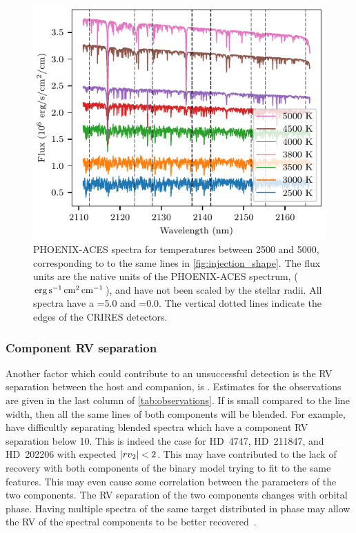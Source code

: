 \begin{figure}
    \centering
    \includegraphics[width=\hsize]{./figures/companion_recovery/companion_spectra.pdf}
    \caption{{PHOENIX-ACES} spectra for temperatures between 2500 and 5000\K{}, corresponding to to the same lines in \cref{fig:injection_shape}.
The flux units are the native units of the {PHOENIX-ACES} spectrum, (\(\rm erg\,s^{-1}\,cm^{2}\,cm^{-1}\)), and have not been scaled by the stellar radii.
All spectra have a \logg{}=5.0 and \feh{}=0.0.
The vertical dotted lines indicate the edges of the CRIRES detectors.}
    \label{fig:comp_spectra}
\end{figure}

\subsubsection{Component {RV} separation}
\label{subsubsec:rv_seperation}
Another factor which could contribute to an unsuccessful detection is the {RV} separation between the host and companion, is \Rvtwo{}.
Estimates for the observations are given in the last column of \cref{tab:observations}.
If \Rvtwo{} is small compared to the line width, then all the same lines of both components will be blended. For example, \citep{kolbl_detection_2015} have difficultly separating blended spectra which have a component {RV} separation below 10\kmps{}.
This is indeed the case for {HD~4747}, {HD~211847}, and {HD~202206} with expected \(|{rv{}}_{2}{}| < 2\)\kmps{}.
This may have contributed to the lack of recovery with both components of the binary model trying to fit to the same features.
This may even cause some correlation between the parameters of the two components.
The {RV} separation of the two components changes with orbital phase.
Having multiple spectra of the same target distributed in phase may allow the {RV} of the spectral components to be better recovered~\citep [e.g.][]{czekala_disentangling_2017, sablowski_spectral_2016, piskorz_evidence_2016}.


